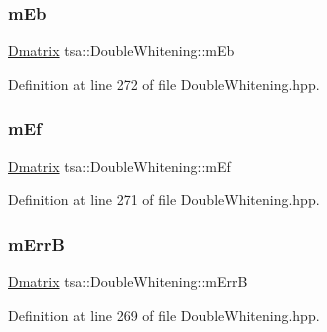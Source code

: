 \subsubsection{\texorpdfstring{m\+Eb}{mEb}}
{\footnotesize\ttfamily \hyperlink{namespacetsa_ad260cd21c1891c4ed391fe788569aba4}{Dmatrix} tsa\+::\+Double\+Whitening\+::m\+Eb\hspace{0.3cm}{\ttfamily [private]}}



Definition at line 272 of file Double\+Whitening.\+hpp.

\mbox{\label{classtsa_1_1_double_whitening_a210ca70e697ac431e21381905392223f}} 
\subsubsection{\texorpdfstring{m\+Ef}{mEf}}
{\footnotesize\ttfamily \hyperlink{namespacetsa_ad260cd21c1891c4ed391fe788569aba4}{Dmatrix} tsa\+::\+Double\+Whitening\+::m\+Ef\hspace{0.3cm}{\ttfamily [private]}}



Definition at line 271 of file Double\+Whitening.\+hpp.

\mbox{\label{classtsa_1_1_double_whitening_aeb88a0efebbd64e8b1cacaf574e62cfb}} 
\subsubsection{\texorpdfstring{m\+ErrB}{mErrB}}
{\footnotesize\ttfamily \hyperlink{namespacetsa_ad260cd21c1891c4ed391fe788569aba4}{Dmatrix} tsa\+::\+Double\+Whitening\+::m\+ErrB\hspace{0.3cm}{\ttfamily [private]}}



Definition at line 269 of file Double\+Whitening.\+hpp.

\mbox{\label{classtsa_1_1_double_whitening_aa89217d3e82036c041f44e8f9d31951c}} 
